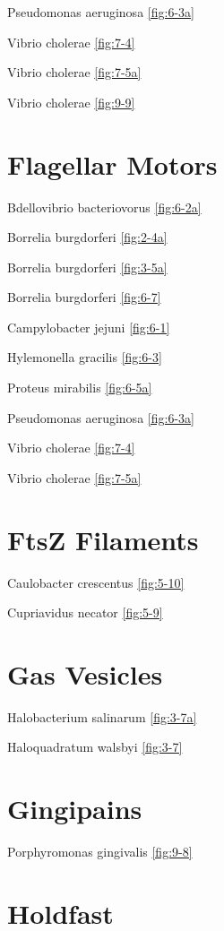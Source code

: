 \documentclass[]{tufte-book}
\begin{document}
Pseudomonas aeruginosa \ref{fig:6-3a}

Vibrio cholerae \ref{fig:7-4}

Vibrio cholerae \ref{fig:7-5a}

Vibrio cholerae \ref{fig:9-9}

\section{\texorpdfstring{\textbf{Flagellar
Motors}}{Flagellar Motors}}\label{flagellar-motors}

Bdellovibrio bacteriovorus \ref{fig:6-2a}

Borrelia burgdorferi \ref{fig:2-4a}

Borrelia burgdorferi \ref{fig:3-5a}

Borrelia burgdorferi \ref{fig:6-7}

Campylobacter jejuni \ref{fig:6-1}

Hylemonella gracilis \ref{fig:6-3}

Proteus mirabilis \ref{fig:6-5a}

Pseudomonas aeruginosa \ref{fig:6-3a}

Vibrio cholerae \ref{fig:7-4}

Vibrio cholerae \ref{fig:7-5a}

\section{\texorpdfstring{\textbf{FtsZ
Filaments}}{FtsZ Filaments}}\label{ftsz-filaments}

Caulobacter crescentus \ref{fig:5-10}

Cupriavidus necator \ref{fig:5-9}

\section{\texorpdfstring{\textbf{Gas
Vesicles}}{Gas Vesicles}}\label{gas-vesicles}

Halobacterium salinarum \ref{fig:3-7a}

Haloquadratum walsbyi \ref{fig:3-7}

\section{\texorpdfstring{\textbf{Gingipains}}{Gingipains}}\label{gingipains}

Porphyromonas gingivalis \ref{fig:9-8}

\section{\texorpdfstring{\textbf{Holdfast}}{Holdfast}}\label{holdfast}
\end{document}
